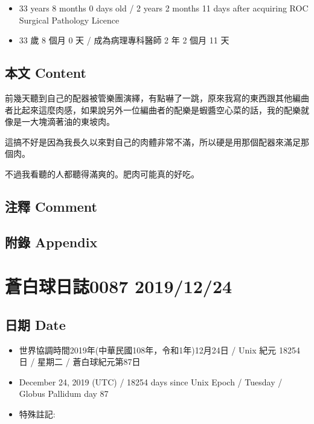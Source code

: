 \documentclass[
]{article}
\providecommand{\tightlist}{%
  \setlength{\itemsep}{0pt}\setlength{\parskip}{0pt}}
\begin{document}
\begin{itemize}
\tightlist
\item
  33 years 8 months 0 days old / 2 years 2 months 11 days after
  acquiring ROC Surgical Pathology Licence
\item
  33 歲 8 個月 0 天 / 成為病理專科醫師 2 年 2 個月 11 天
\end{itemize}

\hypertarget{ux672cux6587-content-22}{%
\subsection{本文 Content}\label{ux672cux6587-content-22}}

前幾天聽到自己的配器被管樂團演繹，有點嚇了一跳，原來我寫的東西跟其他編曲者比起來這麼肉感，如果說另外一位編曲者的配樂是蝦醬空心菜的話，我的配樂就像是一大塊滴著油的東坡肉。

這搞不好是因為我長久以來對自己的肉體非常不滿，所以硬是用那個配器來滿足那個肉。

不過我看聽的人都聽得滿爽的。肥肉可能真的好吃。

\hypertarget{ux6ce8ux91cb-comment-21}{%
\subsection{注釋 Comment}\label{ux6ce8ux91cb-comment-21}}

\hypertarget{ux9644ux9304-appendix-22}{%
\subsection{附錄 Appendix}\label{ux9644ux9304-appendix-22}}

\hypertarget{ux84bcux767dux7403ux65e5ux8a8c0087-20191224}{%
\section{蒼白球日誌0087
2019/12/24}\label{ux84bcux767dux7403ux65e5ux8a8c0087-20191224}}

\hypertarget{ux65e5ux671f-date-23}{%
\subsection{日期 Date}\label{ux65e5ux671f-date-23}}

\begin{itemize}
\tightlist
\item
  世界協調時間2019年(中華民國108年，令和1年)12月24日 / Unix 紀元 18254
  日 / 星期二 / 蒼白球紀元第87日
\item
  December 24, 2019 (UTC) / 18254 days since Unix Epoch / Tuesday /
  Globus Pallidum day 87
\item
  特殊註記:
\end{itemize}
\end{document}
